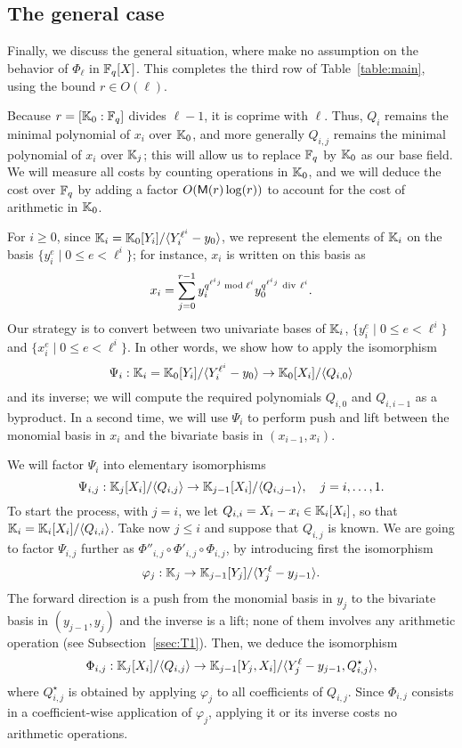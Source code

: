 \documentclass{sig-alternate}
\begin{document}
\subsection{The general case}\label{ssec:gal}

Finally, we discuss the general situation, where make no
assumption on the behavior of $\Phi_\ell$ in $\mathbb{F}_q[X]$. This completes
the third row of Table~\ref{table:main}, using the bound $r\in O(\ell)$.

Because $r=[\mathbb{K}_0 : \mathbb{F}_q]$ divides $\ell-1$, it is coprime with
$\ell$. Thus, $Q_i$ remains the minimal polynomial of $x_i$ over
$\mathbb{K}_0$, and more generally $Q_{i,j}$ remains the minimal polynomial of
$x_i$ over $\mathbb{K}_{j}$; this will allow us to replace $\mathbb{F}_q$ by $\mathbb{K}_0$ as
our base field. We will measure all costs by counting operations in
$\mathbb{K}_0$, and we will deduce the cost over $\mathbb{F}_q$ by adding a factor
$O(\mathsf{M}(r)\log(r))$ to account for the cost of arithmetic in $\mathbb{K}_0$.

For $i \ge 0$, since $\mathbb{K}_i=\mathbb{K}_0[Y_i]/\langle Y_i^{\ell^i}-y_0\rangle$,
we represent the elements of $\mathbb{K}_i$ on the basis $\{y_i^e \mid 0 \le e
< \ell^i\}$; for instance, $x_i$ is written on this basis as
\begin{equation}\label{eq-def:xiyi}
x_i = \sum_{j = 0}^{r-1} y_i^{q^{\ell^i j} \bmod \ell^i}
y_0^{q^{\ell^i j} {\rm~div~} \ell^i}. 
\end{equation}
Our strategy is to convert between two univariate bases of $\mathbb{K}_i$,
$\{y_i^e \mid 0 \le e < \ell^i\}$ and $\{x_i^e \mid 0 \le e <
\ell^i\}$. In other words, we show how to apply the isomorphism
$$\Psi_i: \mathbb{K}_i=\mathbb{K}_0[Y_i]/\langle Y_i^{\ell^i}-y_0\rangle \to
\mathbb{K}_0[X_i]/\langle Q_{i,0}\rangle$$ and its inverse; we will compute
the required polynomials $Q_{i,0}$ and $Q_{i,i-1}$ as a byproduct. In
a second time, we will use $\Psi_i$ to perform push and lift between
the monomial basis in $x_i$ and the bivariate basis in
$(x_{i-1},x_i)$.

We will factor $\Psi_i$ into elementary
isomorphisms
$$\Psi_{i,j}: \mathbb{K}_j[X_i]/\langle Q_{i,j}\rangle \to
\mathbb{K}_{j-1}[X_i]/\langle Q_{i,j-1}\rangle, \quad j=i,\dots,1.$$ To start
the process, with $j=i$, we let $Q_{i,i}=X_i-x_i \in \mathbb{K}_i[X_i]$, so
that $\mathbb{K}_i=\mathbb{K}_i[X_i]/\langle Q_{i,i} \rangle$.
Take now $j \le i$ and suppose that $Q_{i,j}$ is known. We are going to
factor $\Psi_{i,j}$ further as $\Phi''_{i,j} \circ \Phi'_{i,j} \circ
\Phi_{i,j}$, by introducing first the isomorphism
$$\varphi_j: \mathbb{K}_j \to \mathbb{K}_{j-1}[Y_j]/\langle Y_j^\ell-y_{j-1}\rangle.$$
The forward direction is a push from the monomial basis in $y_j$ to
the bivariate basis in $(y_{j-1},y_j)$ and the inverse is a lift; none
of them involves any arithmetic operation (see
Subsection~\ref{ssec:T1}).  Then, we deduce the isomorphism
$$\Phi_{i,j}: \mathbb{K}_j[X_i]/\langle Q_{i,j} \rangle \to
\mathbb{K}_{j-1}[Y_j,X_i]/\langle Y_j^\ell-y_{j-1}, Q^\star_{i,j}\rangle,$$
where $Q^\star_{i,j}$ is obtained by applying $\varphi_j$ to all
coefficients of $Q_{i,j}$. Since $\Phi_{i,j}$ consists in a
coefficient-wise application of $\varphi_j$, applying it or its
inverse costs no arithmetic operations.
\end{document}
